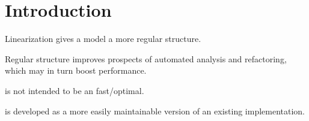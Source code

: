 \chapter{Introduction}

Linearization gives a model a more regular structure.

Regular structure improves prospects of automated analysis and refactoring, which may in turn boost performance.

\lpeq{} is not intended to be an fast/optimal.

\lpeq{} is developed as a more easily maintainable version of an existing implementation.

